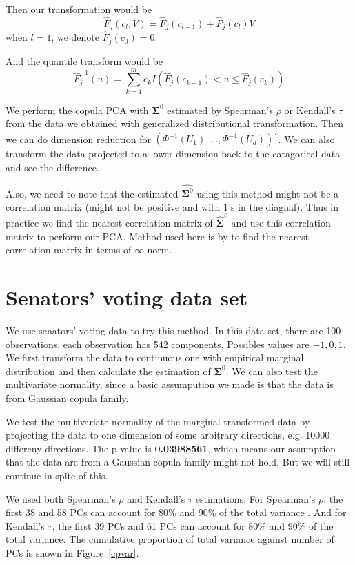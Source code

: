 \documentclass{article}
\theoremstyle{definition}
\begin{document}
	Then our transformation would be
	\[\hat{F}_j(c_l, V) = \hat{F}_j(c_{l-1}) + \hat{P}_j(c_l) V\]
	when $l = 1$, we denote $\hat{F}_j(c_0) = 0$.

	And the quantile transform would be
	\[\hat{F}_j^{-1} (u) = \sum_{k=1}^m c_k I(\hat{F}_j(c_{k-1}) < u \leq \hat{F}_j(c_k) )\]

	We perform the copula PCA with $\bm \Sigma^0$ estimated by Spearman's $\rho$ or Kendall's $\tau$ from the data we obtained with generalized distributional transformation. Then we can do dimension reduction for $(\Phi^{-1}(U_1), \ldots, \Phi^{-1}(U_d))^T$. We can also transform the data projected to a lower dimension back to the catagorical data and see the difference. 

	Also, we need to note that the estimated $\hat{\bm \Sigma^0}$ using this method might not be a correlation matrix (might not be positive and with 1's in the diagnal). Thus in practice we find the nearest correlation matrix of $\hat{\bm \Sigma}^0$ and use this correlation matrix to perform our PCA. Method used here is by \cite{higham2002computing} to find the nearest correlation matrix in terms of $\infty$ norm.

	\section{Senators' voting data set}
	We use senators' voting data to try this method. In this data set, there are 100 observations, each observation has 542 components. Possibles values are $-1, 0 ,1$. We first transform the data to continuous one with empirical marginal distribution and then calculate the estimation of $\bm \Sigma^0$. We can also test the multivariate normality, since a basic assumpution we made is that the data is from Gaussian copula family.

	We test the multivariate normality of the marginal transformed data by projecting the data to one dimension of some arbitrary directions, e.g. 10000 differeny directions. The p-value is \textbf{0.03988561}, which means our assumption that the data are from a Gaussian copula family might not hold. But we will still continue in spite of this.

	We used both Spearman's $\rho$ and Kendall's $\tau$ estimations. For Spearman's $\rho$, the first 38 and 58 PCs can account for 80\% and 90\% of the total variance . And for Kendall's $\tau$, the first 39 PCs and 61 PCs can account for 80\% and 90\% of the total variance. The cumulative proportion of total variance against number of PCs is shown in Figure~\ref{cpvar}.
\end{document}
